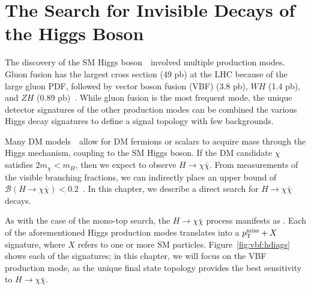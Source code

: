 \chapter{The Search for Invisible Decays of the Higgs Boson}
\label{sec:vbf}

The discovery of the SM Higgs boson~\needcite~involved multiple production modes.
Gluon fusion has the largest cross section (49 pb) at the LHC because of the large gluon PDF, followed by vector boson fusion (VBF) (3.8 pb), $WH$ (1.4 pb), and $ZH$ (0.89 pb)~\cite{lhchxswg}.
While gluon fusion is the most frequent mode, the unique detector signatures of the other production modes can be combined the various Higgs decay signatures to define a signal topology with few backgrounds.

Many DM models~\needcite~allow for DM fermions or scalars to acquire mass through the Higgs mechanism, coupling to the SM Higgs boson.
If the DM candidate $\chi$ satisfies $2m_\chi < m_H$, then we expect to observe $H\rightarrow\chi\bar\chi$.
From measurements of the visible branching fractions, we can indirectly place an upper bound of $\mathcal{B}(H\rightarrow\chi\bar\chi)<0.2$~\needcite.
In this chapter, we describe a direct search for $H\rightarrow\chi\bar\chi$ decays.

As with the case of the mono-top search, the $H\rightarrow\chi\bar\chi$ process manifests as \ptmiss. 
Each of the aforementioned Higgs production modes translates into a $p_\mathrm{T}^\mathrm{miss}+X$ signature, where $X$ refers to one or more SM particles.
Figure~\ref{fig:vbf:hdiags} shows each of the signatures; in this chapter, we will focus on the VBF production mode, as the unique final state topology provides the best sensitivity to $H\rightarrow\chi\bar\chi$.

